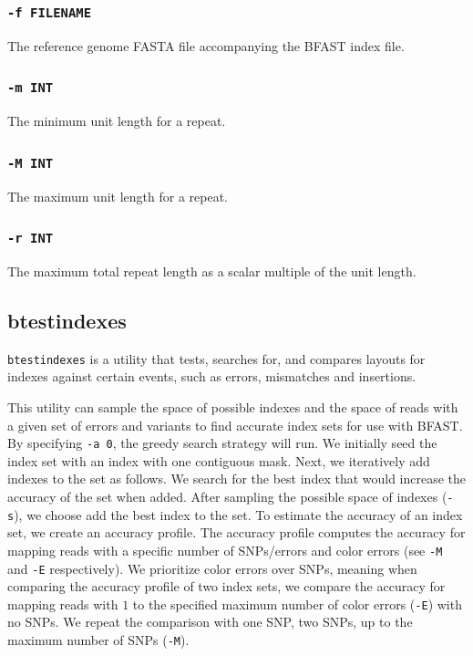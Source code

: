 \documentclass[a4paper,12pt]{book}
\newcommand{\TT}[1]{{\tt #1}} %
\newcommand{\rGFF}{reference genome FASTA file}
\newcommand{\BIF}{BFAST index file} %
\begin{document}
\subsubsection{\TT{-f FILENAME}}
The \rGFF{} accompanying the \BIF{}.

\subsubsection{\TT{-m INT}}
The minimum unit length for a repeat.

\subsubsection{\TT{-M INT}}
The maximum unit length for a repeat.

\subsubsection{\TT{-r INT}}
The maximum total repeat length as a scalar multiple of the unit length.

\subsection{btestindexes}
\label{sec:btestindexes}
\TT{btestindexes} is a utility that tests, searches for, and compares layouts for indexes against certain events, such as errors, mismatches and insertions.

This utility can sample the space of possible indexes and the space of reads with a given set of errors and variants to find accurate index sets for use with BFAST.
By specifying \TT{-a 0}, the greedy search strategy will run.
We initially seed the index set with an index with one contiguous mask.
Next, we iteratively add indexes to the set as follows.
We search for the best index that would increase the accuracy of the set when added.
After sampling the possible space of indexes (\TT{-s}), we choose add the best index to the set.
To estimate the accuracy of an index set, we create an accuracy profile.
The accuracy profile computes the accuracy for mapping reads with a specific number of SNPs/errors and color errors (see \TT{-M} and \TT{-E} respectively).
We prioritize color errors over SNPs, meaning when comparing the accuracy profile of two index sets, we compare the accuracy for mapping reads with $1$ to the specified maximum number of color errors (\TT{-E}) with no SNPs.
We repeat the comparison with one SNP, two SNPs, up to the maximum number of SNPs (\TT{-M}).
\end{document}
